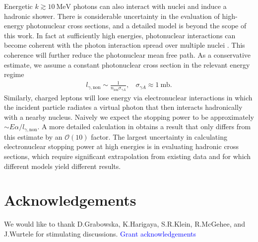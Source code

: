 \documentclass[twocolumn,showpacs,preprintnumbers,amsmath,amssymb,prd]{revtex4}
\newcommand{\OO}{\mathcal{O}}
\begin{document}
\begin{appendices}
Energetic $k \gtrsim 10 ~\text{MeV}$ photons can also interact with nuclei and induce a hadronic shower.
There is considerable uncertainty in the evaluation of high-energy photonuclear cross sections, and a detailed model is beyond the scope of this work.
In fact at sufficiently high energies, photonuclear interactions can become coherent with the photon interaction spread over multiple nuclei \cite{Gerhardt:2010bj}.
This coherence will further reduce the photonuclear mean free path.
As a conservative estimate, we assume a constant photonuclear cross section in the relevant energy regime
\begin{align}
l_{\gamma, \text{non}} \sim \frac{1}{n_\text{ion} \sigma_{\gamma A}}, ~~~~ \sigma_{\gamma A} \approx 1 ~\text{mb}.
\end{align}
Similarly, charged leptons will lose energy via electronuclear interactions in which the incident particle radiates a virtual photon that then interacts hadronically with a nearby nucleus.
Naively we expect the stopping power to be approximately $\sim E \alpha/l_{\gamma, \text{non}}$.
A more detailed calculation in \cite{Gerhardt:2010bj} obtains a result that only differs from this estimate by an $\OO(10)$ factor.
The largest uncertainty in calculating electronuclear stopping power at high energies is in evaluating hadronic cross sections, which require significant extrapolation from existing data and for which different models yield different results.

\end{appendices}
\section*{Acknowledgements}
We would like to thank D.Grabowska, K.Harigaya, S.R.Klein, R.McGehee, and J.Wurtele for stimulating discussions.
\textcolor{blue}{Grant acknowledgements}


\end{document}
